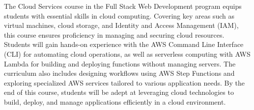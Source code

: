 The Cloud Services course in the Full Stack Web Development program equips students with essential skills in cloud computing.
Covering key areas such as virtual machines, cloud storage, and Identity and Access Management (IAM), this course ensures proficiency in managing and securing cloud resources.
Students will gain hands-on experience with the AWS Command Line Interface (CLI) for automating cloud operations, as well as serverless computing with AWS Lambda for building and deploying functions without managing servers.
The curriculum also includes designing workflows using AWS Step Functions and exploring specialized AWS services tailored to various application needs.
By the end of this course, students will be adept at leveraging cloud technologies to build, deploy, and manage applications efficiently in a cloud environment.
